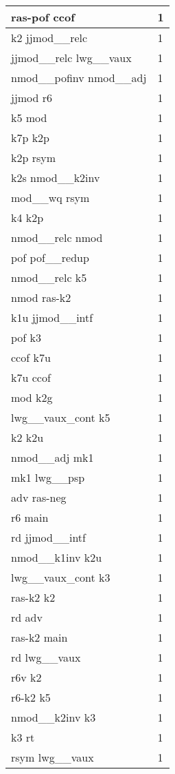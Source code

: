 \documentclass[a4 paper]{article}
\begin{document}
\begin{longtable}{p{}p{}}
ras-pof ccof  & 1 \\ \midrule
k2 jjmod\_\_relc  & 1 \\ \midrule
jjmod\_\_relc lwg\_\_vaux  & 1 \\ \midrule
nmod\_\_pofinv nmod\_\_adj  & 1 \\ \midrule
jjmod r6  & 1 \\ \midrule
k5 mod  & 1 \\ \midrule
k7p k2p  & 1 \\ \midrule
k2p rsym  & 1 \\ \midrule
k2s nmod\_\_k2inv  & 1 \\ \midrule
mod\_\_wq rsym  & 1 \\ \midrule
k4 k2p  & 1 \\ \midrule
nmod\_\_relc nmod  & 1 \\ \midrule
pof pof\_\_redup  & 1 \\ \midrule
nmod\_\_relc k5  & 1 \\ \midrule
nmod ras-k2  & 1 \\ \midrule
k1u jjmod\_\_intf  & 1 \\ \midrule
pof k3  & 1 \\ \midrule
ccof k7u  & 1 \\ \midrule
k7u ccof  & 1 \\ \midrule
mod k2g  & 1 \\ \midrule
lwg\_\_vaux\_cont k5  & 1 \\ \midrule
k2 k2u  & 1 \\ \midrule
nmod\_\_adj mk1  & 1 \\ \midrule
mk1 lwg\_\_psp  & 1 \\ \midrule
adv ras-neg  & 1 \\ \midrule
r6 main  & 1 \\ \midrule
rd jjmod\_\_intf  & 1 \\ \midrule
nmod\_\_k1inv k2u  & 1 \\ \midrule
lwg\_\_vaux\_cont k3  & 1 \\ \midrule
ras-k2 k2  & 1 \\ \midrule
rd adv  & 1 \\ \midrule
ras-k2 main  & 1 \\ \midrule
rd lwg\_\_vaux  & 1 \\ \midrule
r6v k2  & 1 \\ \midrule
r6-k2 k5  & 1 \\ \midrule
nmod\_\_k2inv k3  & 1 \\ \midrule
k3 rt  & 1 \\ \midrule
rsym lwg\_\_vaux  & 1 \\ \midrule

\end{longtable}
\end{document}
